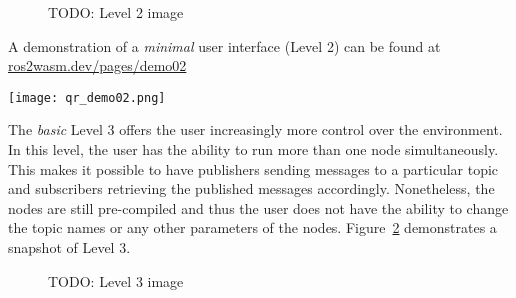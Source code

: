         \begin{figure}[htbp]
            \centering
            \caption{TODO: Level 2 image}\label{fig:ui2}
        \end{figure}

        \begin{tcolorbox}[title=Example 2]
            \begin{minipage}[t]{0.87\linewidth}
                \vspace*{0.5\baselineskip}
                A demonstration of a \textit{minimal} user interface (Level 2) can
                be found at \href{https://ros2wasm.dev/pages/demo02/index.html}{\textsf{ros2wasm.dev/pages/demo02}}
            \end{minipage}\hfill%
            \begin{minipage}[t]{0.1\linewidth}
                \vspace*{0pt}
                \texttt{[image: qr\_demo02.png]}
            \end{minipage}
        \end{tcolorbox}



        The \textit{basic} Level 3 offers the user increasingly more control over
        the environment. In this level, the user has the ability to run more than
        one node simultaneously. This makes it possible to have publishers sending
        messages to a particular topic and subscribers retrieving the published
        messages accordingly. Nonetheless, the nodes are still pre-compiled and 
        thus the user does not have the ability to change the topic names or any
        other parameters of the nodes. Figure~\ref{fig:ui3} demonstrates a snapshot 
        of Level 3.

        \begin{figure}[htbp]
            \centering
            \caption{TODO: Level 3 image}\label{fig:ui3}
        \end{figure}

